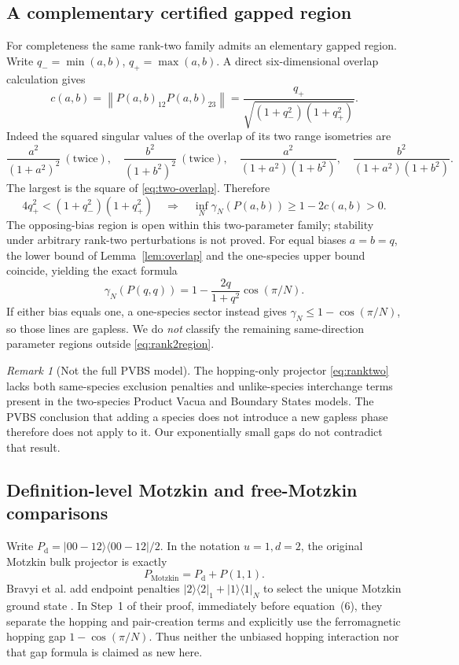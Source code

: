 \documentclass[11pt,a4paper]{article}
\theoremstyle{remark}\newtheorem{remark}[theorem]{Remark}
\newcommand{\ket}[1]{\lvert #1\rangle}
\newcommand{\bra}[1]{\langle #1\rvert}
\newcommand{\norm}[1]{\left\lVert #1\right\rVert}
\begin{document}
\subsection{A complementary certified gapped region}
For completeness the same rank-two family admits an elementary gapped region. Write
$q_- =\min(a,b)$, $q_+=\max(a,b)$. A direct six-dimensional overlap calculation gives
\begin{equation}\label{eq:two-overlap}
 c(a,b)=\norm{P(a,b)_{12}P(a,b)_{23}}
       =\frac{q_+}{\sqrt{(1+q_-^2)(1+q_+^2)}}.
\end{equation}
Indeed the squared singular values of the overlap of its two range isometries are
\[
 \frac{a^2}{(1+a^2)^2}\ (\text{twice}),\quad
 \frac{b^2}{(1+b^2)^2}\ (\text{twice}),\quad
 \frac{a^2}{(1+a^2)(1+b^2)},\quad
 \frac{b^2}{(1+a^2)(1+b^2)}.
\]
The largest is the square of \eqref{eq:two-overlap}. Therefore
\begin{equation}\label{eq:rank2region}
 4q_+^2<(1+q_-^2)(1+q_+^2)
 \quad\Longrightarrow\quad
 \inf_N\gamma_N(P(a,b))\ge1-2c(a,b)>0.
\end{equation}
The opposing-bias region is open within this two-parameter family; stability under arbitrary rank-two perturbations is not proved. For equal biases $a=b=q$, the lower bound of Lemma~\ref{lem:overlap} and the one-species upper bound coincide, yielding the exact formula
\[
 \gamma_N(P(q,q))=1-\frac{2q}{1+q^2}\cos(\pi/N).
\]
If either bias equals one, a one-species sector instead gives
$\gamma_N\le1-\cos(\pi/N)$, so those lines are gapless. We do \emph{not} classify the remaining same-direction parameter regions outside \eqref{eq:rank2region}.

\begin{remark}[Not the full PVBS model]\label{rem:pvbs}
The hopping-only projector \eqref{eq:ranktwo} lacks both same-species exclusion penalties and unlike-species interchange terms present in the two-species Product Vacua and Boundary States models. The PVBS conclusion that adding a species does not introduce a new gapless phase \cite{Bishop} therefore does not apply to it. Our exponentially small gaps do not contradict that result.
\end{remark}


\subsection{Definition-level Motzkin and free-Motzkin comparisons}\label{sec:motzkin}
Write $P_{\mathrm d}=\ket{00-12}\bra{00-12}/2$. In the notation $u=1,d=2$, the original Motzkin bulk projector is exactly
\[
 P_{\mathrm{Motzkin}}=P_{\mathrm d}+P(1,1).
\]
Bravyi et al. add endpoint penalties $\ket2\bra2_1+\ket1\bra1_N$ to select the unique Motzkin ground state \cite{Motzkin}. In Step~1 of their proof, immediately before equation~(6), they separate the hopping and pair-creation terms and explicitly use the ferromagnetic hopping gap $1-\cos(\pi/N)$. Thus neither the unbiased hopping interaction nor that gap formula is claimed as new here.
\end{document}
